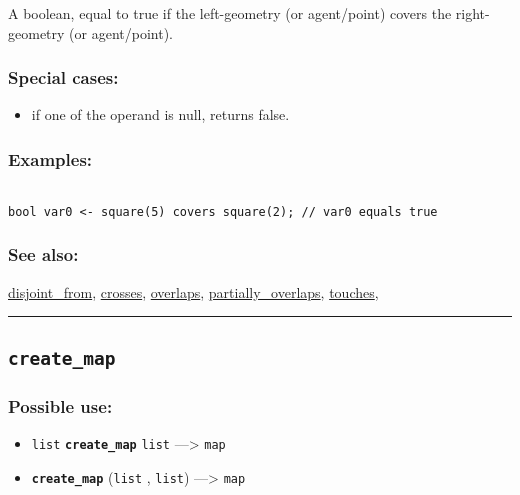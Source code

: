 \documentclass[]{book}
\providecommand{\tightlist}{%
  \setlength{\itemsep}{0pt}\setlength{\parskip}{0pt}}
\theoremstyle{definition}
\theoremstyle{definition}
\theoremstyle{definition}
\theoremstyle{remark}
\begin{document}
A boolean, equal to true if the left-geometry (or agent/point) covers
the right-geometry (or agent/point).

\subsubsection{Special cases:}\label{special-cases-42}

\begin{itemize}
\tightlist
\item
  if one of the operand is null, returns false.
\end{itemize}

\subsubsection{Examples:}\label{examples-86}

\begin{verbatim}
 
bool var0 <- square(5) covers square(2); // var0 equals true
\end{verbatim}

\subsubsection{See also:}\label{see-also-70}

\href{operators-d-to-h.html\#disjoint_from}{disjoint\_from},
\href{operators-b-to-c.html\#crosses}{crosses},
\href{operators-n-to-r.html\#overlaps}{overlaps},
\href{operators-n-to-r.html\#partially_overlaps}{partially\_overlaps},
\href{operators-s-to-z.html\#touches}{touches},

\begin{center}\rule{0.5\linewidth}{\linethickness}\end{center}

\subsection{\texorpdfstring{\texttt{create\_map}}{create\_map}}\label{create_map}

\subsubsection{Possible use:}\label{possible-use-115}

\begin{itemize}
\tightlist
\item
  \texttt{list} \textbf{\texttt{create\_map}} \texttt{list}
  ---\textgreater{} \texttt{map}
\item
  \textbf{\texttt{create\_map}} (\texttt{list} , \texttt{list})
  ---\textgreater{} \texttt{map}
\end{itemize}
\end{document}
